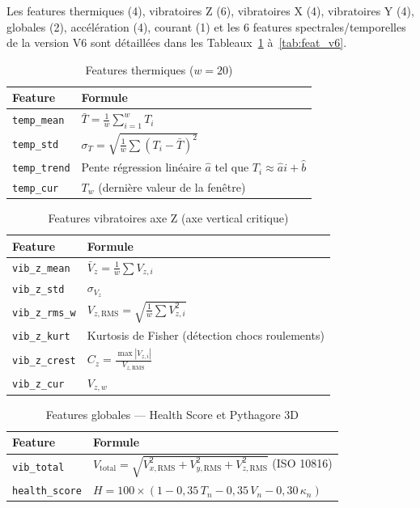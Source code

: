 \documentclass[12pt,a4paper]{report}
\begin{document}
Les features thermiques (4), vibratoires Z (6), vibratoires X (4), vibratoires Y (4),
globales (2), accélération (4), courant (1) et les 6 features spectrales/temporelles
de la version V6 sont détaillées dans les Tableaux~\ref{tab:feat_temp} à~\ref{tab:feat_v6}.

\begin{table}[h]
\centering
\caption{Features thermiques ($w = 20$)}
\label{tab:feat_temp}
\begin{tabular}{ll}
\toprule
\textbf{Feature} & \textbf{Formule} \\
\midrule
\texttt{temp\_mean}  & $\bar{T} = \frac{1}{w}\sum_{i=1}^{w} T_i$ \\[4pt]
\texttt{temp\_std}   & $\sigma_T = \sqrt{\frac{1}{w}\sum (T_i - \bar{T})^2}$ \\[4pt]
\texttt{temp\_trend} & Pente régression linéaire $\hat{a}$ tel que $T_i \approx \hat{a}i + \hat{b}$ \\
\texttt{temp\_cur}   & $T_w$ (dernière valeur de la fenêtre) \\
\bottomrule
\end{tabular}
\end{table}

\begin{table}[h]
\centering
\caption{Features vibratoires axe Z (axe vertical critique)}
\begin{tabular}{ll}
\toprule
\textbf{Feature} & \textbf{Formule} \\
\midrule
\texttt{vib\_z\_mean}  & $\bar{V}_z = \frac{1}{w}\sum V_{z,i}$ \\
\texttt{vib\_z\_std}   & $\sigma_{V_z}$ \\
\texttt{vib\_z\_rms\_w} & $V_{z,\text{RMS}} = \sqrt{\frac{1}{w}\sum V_{z,i}^2}$ \\
\texttt{vib\_z\_kurt}  & Kurtosis de Fisher (détection chocs roulements) \\
\texttt{vib\_z\_crest} & $C_z = \frac{\max|V_{z,i}|}{V_{z,\text{RMS}}}$ \\
\texttt{vib\_z\_cur}   & $V_{z,w}$ \\
\bottomrule
\end{tabular}
\end{table}

\begin{table}[h]
\centering
\caption{Features globales — Health Score et Pythagore 3D}
\begin{tabular}{ll}
\toprule
\textbf{Feature} & \textbf{Formule} \\
\midrule
\texttt{vib\_total}    & $V_{\text{total}} = \sqrt{V_{x,\text{RMS}}^2 + V_{y,\text{RMS}}^2 + V_{z,\text{RMS}}^2}$ (ISO 10816) \\[4pt]
\texttt{health\_score} & $H = 100 \times (1 - 0{,}35\,T_n - 0{,}35\,V_n - 0{,}30\,\kappa_n)$ \\
\bottomrule
\end{tabular}
\end{table}
\end{document}
